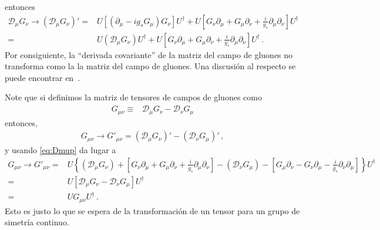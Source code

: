 \begin{frame}
entonces
\begin{align}
\label{eq:Dmup}
\mathcal{D}_{\mu} G_{\nu}\to   \left(   \mathcal{D}_{\mu} G_{\nu} \right)' =& U \left[ \left( \partial_{\mu}-ig_s G_{\mu} \right)G_\nu   \right]U^{\dagger}
    + U \left[ G_{\nu} \partial_{\mu}+G_{\mu}\partial_{\nu}+\frac{i}{g_s} \partial_{\mu}\partial_{\nu} \right] U^{\dagger} \nonumber\\
 =& U \left( \mathcal{D}_{\mu}G_\nu   \right)U^{\dagger}
    + U \left[ G_{\nu} \partial_{\mu}+G_{\mu}\partial_{\nu}+\frac{i}{g_s} \partial_{\mu}\partial_{\nu} \right] U^{\dagger} \,.%
\end{align} 
Por consiguiente, la ``derivada covariante'' de la matriz del campo de gluones no transforma como la la matriz del campo de gluones. Una discusión al respecto se puede encontrar en~\cite{2015arXiv151203827R}.

Note que si definimos la matriz de tensores de campos de gluones como
\begin{align}
   G_{\mu\nu}\equiv & \mathcal{D}_{\mu} G_{\nu}-\mathcal{D}_{\nu} G_{\mu} 
\end{align}
entonces,
\begin{align}
   G_{\mu\nu}\to  G'_{\mu\nu}=\left( \mathcal{D}_{\mu} G_{\nu} \right)'-\left( \mathcal{D}_{\nu} G_{\mu}  \right)'\,,
\end{align}
y usando \eqref{eq:Dmup} da lugar a
\begin{align}
\label{eq:ugum}
    G_{\mu\nu}\to  G'_{\mu\nu}=&  U \left\{ \left( \mathcal{D}_{\mu}G_\nu   \right)
    +  \left[ G_{\nu} \partial_{\mu}+G_{\mu}\partial_{\nu}+\frac{i}{g_s} \partial_{\mu}\partial_{\nu} \right]
  -   \left( \mathcal{D}_{\nu}G_\mu   \right)
    - \left[ G_{\mu} \partial_{\nu}-G_{\nu}\partial_{\mu}-\frac{i}{g_s} \partial_{\nu}\partial_{\mu} \right]  \right\} U^{\dagger} \nonumber\\
=&  U \left[  \mathcal{D}_{\mu}G_\nu 
    -   \mathcal{D}_{\nu}G_\mu
  \right] U^{\dagger} \nonumber\\
=& U G_{\mu\nu} U^{\dagger}\,.
\end{align}
Esto es justo lo que se espera de la transformación de un tensor para un grupo de simetría continuo. 



\end{frame}
